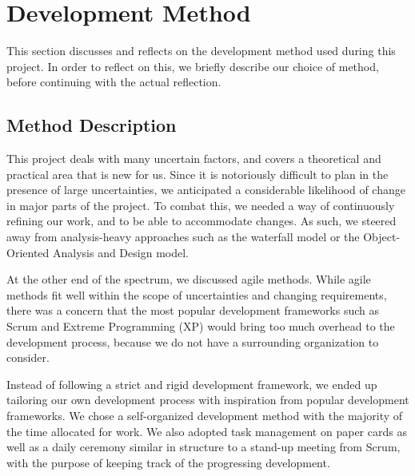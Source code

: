 \section{Development Method}\label{chap:devmethodreflection}
This section discusses and reflects on the development method used during this project. In order to reflect on this, we briefly describe our choice of method, before continuing with the actual reflection.

\subsection{Method Description}
This project deals with many uncertain factors, and covers a theoretical and practical area that is new for us. Since it is notoriously difficult to plan in the presence of large uncertainties, we anticipated a considerable likelihood of change in major parts of the project. To combat this, we needed a way of continuously refining our work, and to be able to accommodate changes. As such, we steered away from analysis-heavy approaches such as the waterfall model or the Object-Oriented Analysis and Design model.

At the other end of the spectrum, we discussed agile methods. While agile methods fit well within the scope of uncertainties and changing requirements, there was a concern that the most popular development frameworks such as Scrum and Extreme Programming (XP) would bring too much overhead to the development process, because we do not have a surrounding organization to consider. %

Instead of following a strict and rigid development framework, we ended up tailoring our own development process with inspiration from popular development frameworks. We chose a self-organized development method with the majority of the time allocated for work. We also adopted task management on paper cards as well as a daily ceremony similar in structure to a stand-up meeting from Scrum, with the purpose of keeping track of the progressing development.

